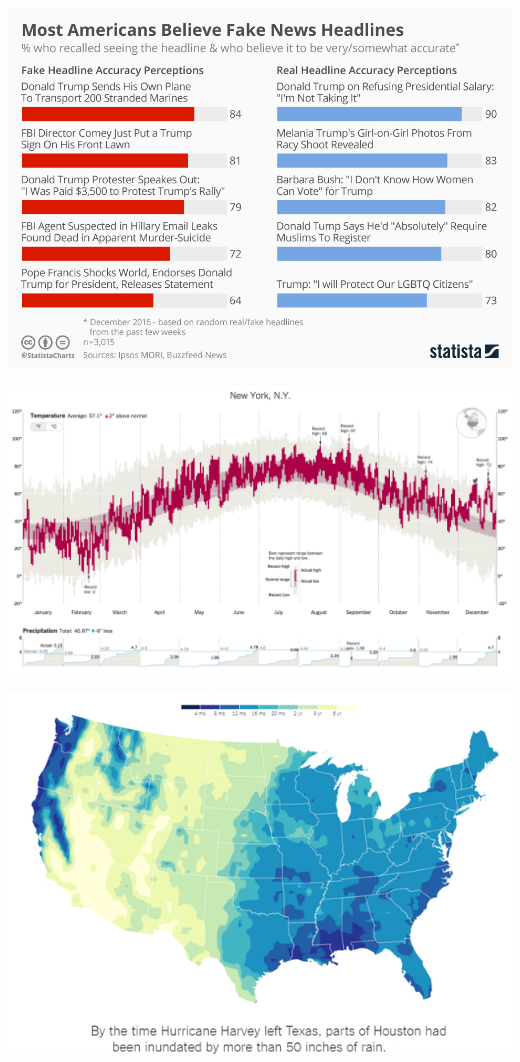 \documentclass[
  letterpaper,
  DIV=11,
  numbers=noendperiod]{scrartcl}
\begin{document}
\includegraphics{images/clipboard-4189732703.png}

\includegraphics{images/clipboard-1399795317.png}

\includegraphics{images/clipboard-2893827168.png}
\end{document}

